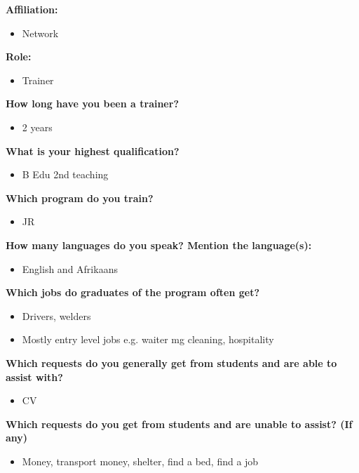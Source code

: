 \noindent\textbf{Affiliation:}
\begin{itemize}
\item Network
\end{itemize}

\noindent\textbf{Role:}
\begin{itemize}
\item Trainer
\end{itemize}

\noindent\textbf{How long have you been a trainer?}
\begin{itemize}
\item 2 years
\end{itemize}

\noindent\textbf{What is your highest qualification?}
\begin{itemize}
\item B Edu 2nd teaching
\end{itemize}

\noindent\textbf{Which program do you train?}
\begin{itemize}
\item JR
\end{itemize}

\noindent\textbf{How many languages do you speak? Mention the language(s):}
\begin{itemize}
\item English and Afrikaans
\end{itemize}



\noindent\textbf{Which jobs do graduates of the program often get?}
\begin{itemize}
\item Drivers, welders
\item Mostly entry level jobs e.g. waiter mg cleaning, hospitality
\end{itemize}

\noindent\textbf{Which requests do you generally get from students and are able to assist with?}
\begin{itemize}
\item CV
\end{itemize}

\noindent\textbf{Which requests do you get from students and are unable to assist? (If any)}
\begin{itemize}
\item Money, transport money, shelter, find a bed, find a job
\end{itemize}

